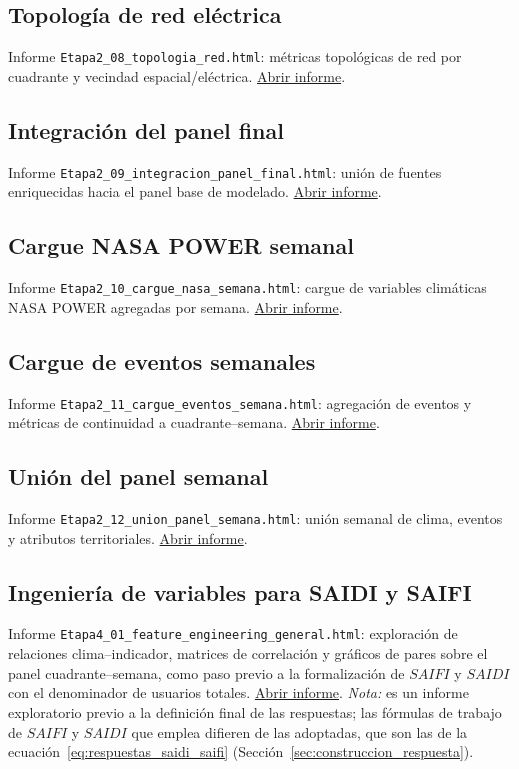 \subsection{Topología de red eléctrica}
\label{app:html-etapa2-08}
Informe \texttt{Etapa2\_08\_topologia\_red.html}: métricas topológicas de red por cuadrante y vecindad espacial/eléctrica.
\href{\urlEtapaDosOcho}{Abrir informe}.

\subsection{Integración del panel final}
\label{app:html-etapa2-09}
Informe \texttt{Etapa2\_09\_integracion\_panel\_final.html}: unión de fuentes enriquecidas hacia el panel base de modelado.
\href{\urlEtapaDosNueve}{Abrir informe}.

\subsection{Cargue NASA POWER semanal}
\label{app:html-etapa2-10}
Informe \texttt{Etapa2\_10\_cargue\_nasa\_semana.html}: cargue de variables climáticas NASA POWER agregadas por semana.
\href{\urlEtapaDosDiez}{Abrir informe}.

\subsection{Cargue de eventos semanales}
\label{app:html-etapa2-11}
Informe \texttt{Etapa2\_11\_cargue\_eventos\_semana.html}: agregación de eventos y métricas de continuidad a cuadrante--semana.
\href{\urlEtapaDosOnce}{Abrir informe}.

\subsection{Unión del panel semanal}
\label{app:html-etapa2-12}
Informe \texttt{Etapa2\_12\_union\_panel\_semana.html}: unión semanal de clima, eventos y atributos territoriales.
\href{\urlEtapaDosDoce}{Abrir informe}.

\subsection{Ingeniería de variables para SAIDI y SAIFI}
\label{app:html-etapa4-01}
Informe \texttt{Etapa4\_01\_feature\_engineering\_general.html}: exploración de relaciones clima--indicador, matrices de correlación y gráficos de pares sobre el panel cuadrante--semana, como paso previo a la formalización de $SAIFI$ y $SAIDI$ con el denominador de usuarios totales.
\href{\urlEtapaCuatroUno}{Abrir informe}. \textit{Nota:} es un informe exploratorio previo a la definición final de las respuestas; las fórmulas de trabajo de $SAIFI$ y $SAIDI$ que emplea difieren de las adoptadas, que son las de la ecuación~\eqref{eq:respuestas_saidi_saifi} (Sección~\ref{sec:construccion_respuesta}).


